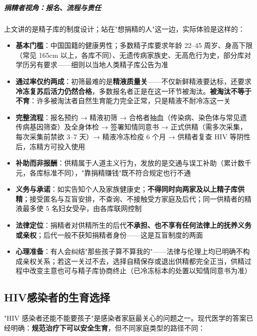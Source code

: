 \subparagraph{捐精者视角：报名、流程与责任}

上文讲的是精子库的制度设计；站在"想捐精的人"这一边，实际体验是这样的：

\begin{itemize}
	\item \textbf{基本门槛}：中国国籍的健康男性；多数精子库要求年龄 22--45 周岁、身高下限（常见 165cm 以上，各库不同）、无遗传病家族史、无高危行为史，部分库对学历另有要求——细则以当地人类精子库公告为准
	\item \textbf{通过率仅约两成}：初筛最难的是\textbf{精液质量关}——不仅新鲜精液要达标，还要求\textbf{冷冻复苏后活力仍然合格}，多数报名者正是在这一环节被淘汰。\textbf{被淘汰不等于不育}：许多被淘汰者自然生育能力完全正常，只是精液不耐冷冻这一关
	\item \textbf{完整流程}：报名预约 → 精液初筛 → 合格者抽血（传染病、染色体与常见遗传病基因筛查）及全身体检 → 签署知情同意书 → 正式供精（需多次采集，每次采集前禁欲 3--7 天）→ 精液冷冻检疫 6 个月 → 供精者复查 HIV 等阴性后，冻精方可投入使用
	\item \textbf{补助而非报酬}：供精属于人道主义行为，发放的是交通与误工补助（累计数千元，各库标准不同），"靠捐精赚钱"既不符合规定也行不通
	\item \textbf{义务与承诺}：如实告知个人及家族健康史；\textbf{不得同时向两家及以上精子库供精}；接受匿名与互盲安排，不查询、不接触受方家庭及后代；同一供精者的精液最多使 5 名妇女受孕，由各库联网控制
	\item \textbf{法律定位}：捐精者对供精所生的后代\textbf{不承担、也不享有任何法律上的抚养义务或亲权}；后代一般不获知捐精者身份——这是互盲制度的两面
	\item \textbf{心理准备}：有人会纠结"那些孩子算不算我的"——法律与伦理上均已明确不构成亲权关系；若这一关过不去，选择自精保存或退出供精都完全正当，供精过程中改变主意也可与精子库协商终止（已冷冻标本的处置以知情同意书为准）
\end{itemize}

\subsection{HIV感染者的生育选择}

"HIV 感染者还能不能要孩子"是感染者家庭最关心的问题之一。现代医学的答案已经明确：\textbf{规范治疗下可以安全生育}，但不同家庭类型的路径不同：


